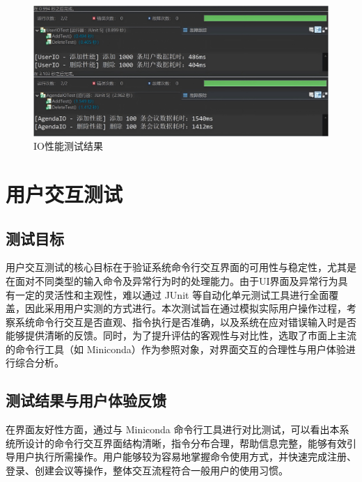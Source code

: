 \documentclass[a4paper, twoside, utf8]{ctexart}
\begin{document}
    \begin{figure}[htbp]
        \centering
        \includegraphics[width=.9\linewidth]{figure/IOTest.png}
        \caption{IO性能测试结果}
    \end{figure}

    \section{用户交互测试}

    \subsection{测试目标}

    用户交互测试的核心目标在于验证系统命令行交互界面的可用性与稳定性，尤其是在面对不同类型的输入命令及异常行为时的处理能力。由于UI界面及异常行为具有一定的灵活性和主观性，难以通过 JUnit 等自动化单元测试工具进行全面覆盖，因此采用用户实测的方式进行。本次测试旨在通过模拟实际用户操作过程，考察系统命令行交互是否直观、指令执行是否准确，以及系统在应对错误输入时是否能够提供清晰的反馈。同时，为了提升评估的客观性与对比性，选取了市面上主流的命令行工具（如 Miniconda）作为参照对象，对界面交互的合理性与用户体验进行综合分析。

    \subsection{测试结果与用户体验反馈}

    在界面友好性方面，通过与 Miniconda 命令行工具进行对比测试，可以看出本系统所设计的命令行交互界面结构清晰，指令分布合理，帮助信息完整，能够有效引导用户执行所需操作。用户能够较为容易地掌握命令使用方式，并快速完成注册、登录、创建会议等操作，整体交互流程符合一般用户的使用习惯。
\end{document}
